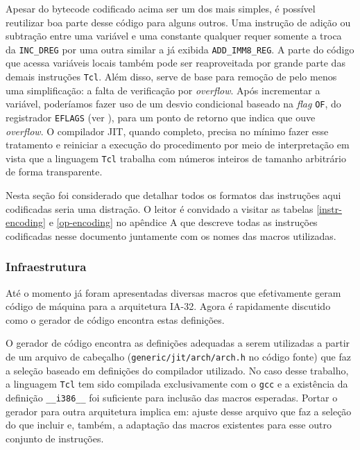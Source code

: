Apesar do bytecode codificado acima ser um dos mais simples, é
possível reutilizar boa parte desse código para alguns outros. Uma
instrução de adição ou subtração entre uma variável e uma constante
qualquer requer somente a troca da \verb!INC_DREG! por uma outra
similar a já exibida \verb!ADD_IMM8_REG!. A parte do código que acessa
variáveis locais também pode ser reaproveitada por grande parte das
demais instruções \texttt{Tcl}. Além disso, serve de base para remoção
de pelo menos uma simplificação: a falta de verificação por
\textit{overflow}. Após incrementar a variável, poderíamos fazer uso
de um desvio condicional baseado na \textit{flag} \verb!OF!, do
registrador \verb!EFLAGS! (ver ),
para um ponto de retorno que indica que
ouve \textit{overflow}. O compilador JIT, quando completo, precisa no
mínimo fazer esse tratamento e reiniciar a execução do procedimento por meio
de interpretação em vista que a linguagem \texttt{Tcl}
trabalha com números inteiros de tamanho arbitrário de forma
transparente.

Nesta seção foi considerado que detalhar todos os formatos das instruções aqui
codificadas seria uma distração. O leitor é convidado a visitar as
tabelas \ref{instr-encoding} e \ref{op-encoding} no apêndice A que
descreve todas as instruções codificadas nesse documento juntamente
com os nomes das macros utilizadas.


\subsubsection{Infraestrutura}

Até o momento já foram apresentadas diversas macros que efetivamente
geram código de máquina para a arquitetura IA-32. Agora é rapidamente
discutido como o gerador de código encontra estas definições.

O gerador de código encontra as definições adequadas a serem
utilizadas a partir de um arquivo de cabeçalho
(\verb!generic/jit/arch/arch.h! no código fonte) que faz a seleção
baseado em definições do compilador utilizado. No caso desse trabalho,
a linguagem \texttt{Tcl} tem sido compilada exclusivamente com o
\texttt{gcc} e a existência da definição \verb!__i386__! foi
suficiente para inclusão das macros esperadas. Portar o gerador para
outra arquitetura implica em: ajuste desse arquivo que faz a seleção do
que incluir e, também, a adaptação das macros existentes para esse outro
conjunto de instruções.

%


